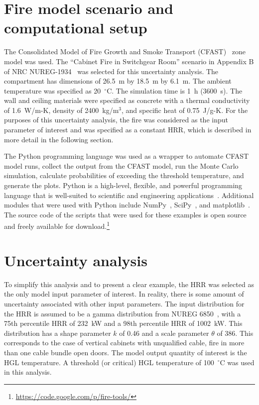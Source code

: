 \documentclass[12pt]{article}
\begin{document}




\section{Fire model scenario and computational setup}
\label{sec:fire_model_scenario_setup}

The Consolidated Model of Fire Growth and Smoke Transport (CFAST)~\cite{CFAST_Users_Guide_6} zone model was used. The ``Cabinet Fire in Switchgear Room'' scenario in Appendix B of NRC NUREG-1934~\cite{NUREG_1934} was selected for this uncertainty analysis. The compartment has dimensions of 26.5~m by 18.5~m by 6.1~m. The ambient temperature was specified as 20~$^\circ$C. The simulation time is 1~h (3600~s). The wall and ceiling materials were specified as concrete with a thermal conductivity of 1.6~W/m-K, density of 2400~kg/m$^3$, and specific heat of 0.75~J/g-K. For the purposes of this uncertainty analysis, the fire was considered as the input parameter of interest and was specified as a constant HRR, which is described in more detail in the following section.

The Python programming language was used as a wrapper to automate CFAST model runs, collect the output from the CFAST model, run the Monte Carlo simulation, calculate probabilities of exceeding the threshold temperature, and generate the plots. Python is a high-level, flexible, and powerful programming language that is well-suited to scientific and engineering applications~\cite{Oliphant:2007}. Additional modules that were used with Python include NumPy~\cite{oliphant2006guide}, SciPy~\cite{Jones:2001fk}, and matplotlib~\cite{Hunter:2007}. The source code of the scripts that were used for these examples is open source and freely available for download.\footnote{\url{https://code.google.com/p/fire-tools/}}


\section{Uncertainty analysis}
\label{sec:uncertainty_analysis}

 To simplify this analysis and to present a clear example, the HRR was selected as the only model input parameter of interest. In reality, there is some amount of uncertainty associated with other input parameters. The input distribution for the HRR is assumed to be a gamma distribution from NUREG 6850~\cite{NUREG_6850}, with a 75th percentile HRR of 232~kW and a 98th percentile HRR of 1002~kW. This distribution has a shape parameter $k$ of 0.46 and a scale parameter $\theta$ of 386. This corresponds to the case of vertical cabinets with unqualified cable, fire in more than one cable bundle open doors. The model output quantity of interest is the HGL temperature. A threshold (or critical) HGL temperature of 100~$^\circ$C was used in this analysis.
\end{document}
